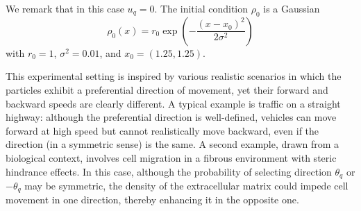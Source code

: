 \documentclass[a4paper]{article}
\theoremstyle{Theorem}\newtheorem{proposition}{Proposition}[section]
\theoremstyle{Remark}\newtheorem{remark}{Remark}[section]
\theoremstyle{Theorem}\newtheorem{theorem}{Theorem}[section]
\begin{document}
We remark that in this case $u_q=0$.
The initial condition $\rho_0$ is a Gaussian
\begin{equation}\label{rho0}
\rho_0(x)=r_0\exp\left(-\dfrac{(x-x_0)^2}{2\sigma^2}\right)    
\end{equation}
with $r_0=1$, $\sigma^2=0.01$, and $x_0=(1.25,1.25)$. 

This experimental setting is inspired by various realistic scenarios in which the particles exhibit a preferential direction of movement, yet their forward and backward speeds are clearly different. A typical example is traffic on a straight highway: although the preferential direction is well-defined, vehicles can move forward at high speed but cannot realistically move backward, even if the direction (in a symmetric sense) is the same. A second example, drawn from a biological context, involves cell migration in a fibrous environment with steric hindrance effects. In this case, although the probability of selecting direction $\theta_q$ or $-\theta_q$ may be symmetric, the density of the extracellular matrix could impede cell movement in one direction, thereby enhancing it in the opposite one.
\end{document}
